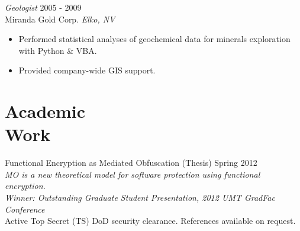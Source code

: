 \documentclass[line,margin]{res}
\begin{document}
\begin{resume}
        {\sl Geologist} \hfill 2005 - 2009 \\
        Miranda Gold Corp. \hfill {\sl Elko, NV}
        \begin{itemize}  \itemsep -2pt %
            \item Performed statistical analyses of geochemical data for minerals exploration with Python \& VBA.
            \item Provided company-wide GIS support.
        \end{itemize}

\section{\sc Academic\\ Work}

        Functional Encryption as Mediated Obfuscation (Thesis) \hfill Spring 2012\\
            \emph{MO is a new theoretical model for software protection using functional encryption. \\
            Winner: Outstanding Graduate Student Presentation, 2012 UMT GradFac Conference}\\

Active Top Secret (TS) DoD security clearance.  References available on request.
\end{resume}
\end{document}

